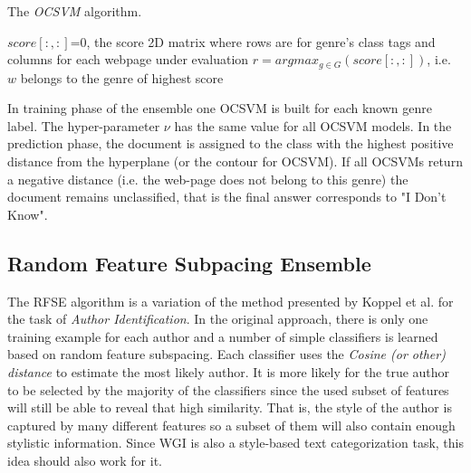 \hfill

\begin{algorithm}[H][t]
\caption{The \textit{OCSVM} algorithm.}\label{chap:openset:sec:alg:OCSVM_Ensemble}
$score[:, :]$=0, the score 2D matrix where rows are for genre's class tags and columns for each webpage under evaluation
{
        $r = argmax_{g \in G}(score[:, :])$, i.e. $w$ belongs to the genre of highest score\;
    }
\end{algorithm}

\hfill

In training phase of the ensemble one OCSVM is built for each known genre label. The hyper-parameter $\nu$ has the same value for all OCSVM models. In the prediction phase, the document is assigned to the class with the highest positive distance from the hyperplane (or the contour for OCSVM). If all OCSVMs return a negative distance (i.e. the web-page does not belong to this genre) the document remains unclassified, that is the final answer corresponds to "I Don't Know".


\subsection{Random Feature Subpacing Ensemble}\label{chap:openset:sec:RFSE_Description}

The RFSE algorithm is a variation of the method presented by Koppel et al. \parencite{koppel2011authorship} for the task of \textit{Author Identification}. In the original approach, there is only one training example for each author and a number of simple classifiers is learned based on random feature subspacing. Each classifier uses the \textit{Cosine (or other) distance} to estimate the most likely author. It is more likely for the true author to be selected by the majority of the classifiers since the used subset of features will still be able to reveal that high similarity. That is, the style of the author is captured by many different features so a subset of them will also contain enough stylistic information. Since WGI is also a style-based text categorization task, this idea should also work for it.

